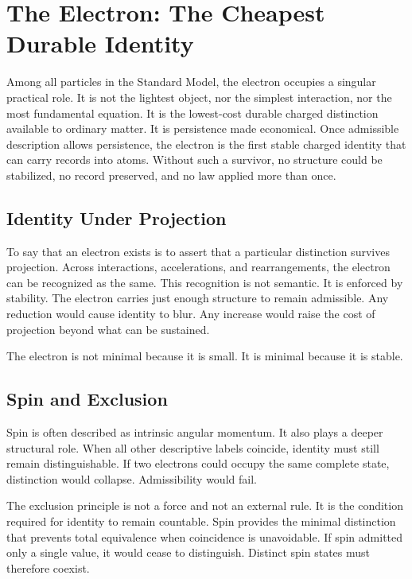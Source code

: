\documentclass[11pt,twoside,openright]{book}
\begin{document}
\chapter{The Electron: The Cheapest Durable Identity}

Among all particles in the Standard Model, the electron occupies a singular practical role. It is not the lightest object, nor the simplest interaction, nor the most fundamental equation. It is the lowest-cost durable charged distinction available to ordinary matter. It is persistence made economical. Once admissible description allows persistence, the electron is the first stable charged identity that can carry records into atoms. Without such a survivor, no structure could be stabilized, no record preserved, and no law applied more than once.

\section*{Identity Under Projection}

To say that an electron exists is to assert that a particular distinction survives projection. Across interactions, accelerations, and rearrangements, the electron can be recognized as the same. This recognition is not semantic. It is enforced by stability. The electron carries just enough structure to remain admissible. Any reduction would cause identity to blur. Any increase would raise the cost of projection beyond what can be sustained.

The electron is not minimal because it is small. It is minimal because it is stable.

\section*{Spin and Exclusion}

Spin is often described as intrinsic angular momentum. It also plays a deeper structural role. When all other descriptive labels coincide, identity must still remain distinguishable. If two electrons could occupy the same complete state, distinction would collapse. Admissibility would fail.

The exclusion principle is not a force and not an external rule. It is the condition required for identity to remain countable. Spin provides the minimal distinction that prevents total equivalence when coincidence is unavoidable. If spin admitted only a single value, it would cease to distinguish. Distinct spin states must therefore coexist.
\end{document}
